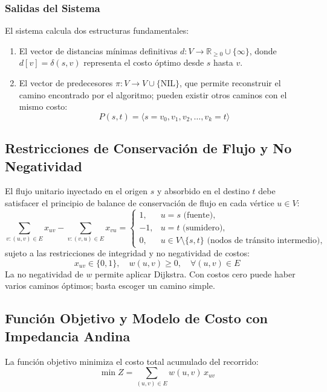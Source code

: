 \subsubsection{Salidas del Sistema}
El sistema calcula dos estructuras fundamentales:
\begin{enumerate}
    \item El vector de distancias mínimas definitivas $d: V \to \mathbb{R}_{\ge 0} \cup \{\infty\}$, donde $d[v] = \delta(s, v)$ representa el costo óptimo desde $s$ hasta $v$.
    \item El vector de predecesores $\pi: V \to V \cup \{\text{NIL}\}$, que permite reconstruir el camino encontrado por el algoritmo; pueden existir otros caminos con el mismo costo:
    \begin{equation}
        P(s, t) = \langle s = v_0, v_1, v_2, \dots, v_k = t \rangle
    \end{equation}
\end{enumerate}

\subsection{Restricciones de Conservación de Flujo y No Negatividad}
El flujo unitario inyectado en el origen $s$ y absorbido en el destino $t$ debe satisfacer el principio de balance de conservación de flujo en cada vértice $u \in V$:
\begin{equation}
    \sum_{v: (u, v) \in E} x_{uv} - \sum_{v: (v, u) \in E} x_{vu} = \begin{cases}
        1, & u = s \text{ (fuente)},\\
        -1, & u = t \text{ (sumidero)},\\
        0, & u \in V \setminus \{s, t\} \text{ (nodos de tránsito intermedio)},
    \end{cases}
    \label{eq:flujo}
\end{equation}
sujeto a las restricciones de integridad y no negatividad de costos:
\begin{equation}
    x_{uv} \in \{0, 1\}, \quad w(u, v) \ge 0, \quad \forall (u, v) \in E
\end{equation}
La no negatividad de $w$ permite aplicar Dijkstra. Con costos cero puede haber varios caminos óptimos; basta escoger un camino simple.

\subsection{Función Objetivo y Modelo de Costo con Impedancia Andina}
La función objetivo minimiza el costo total acumulado del recorrido:
\begin{equation}
    \min Z = \sum_{(u, v) \in E} w(u, v) \, x_{uv}
    \label{eq:z}
\end{equation}

